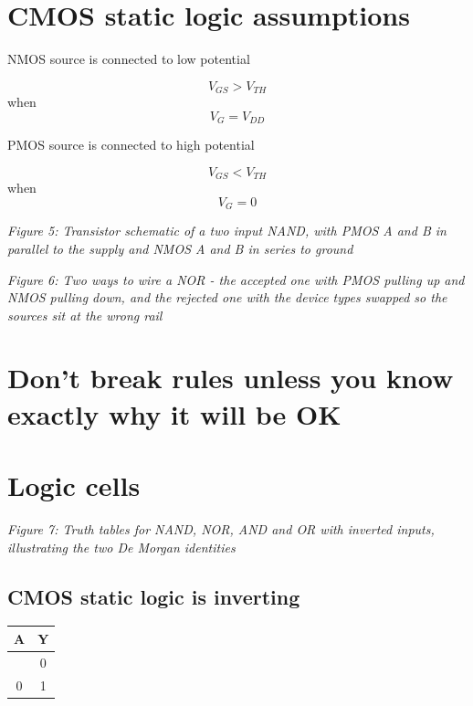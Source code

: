 \section{CMOS static logic
assumptions}\label{cmos-static-logic-assumptions}

NMOS source is connected to low potential

\[ V_{GS} > V_{TH}\] when \[V_G = V_{DD}\]

PMOS source is connected to high potential

\[ V_{GS} < V_{TH}\] when \[V_G = 0\]


{
\centering
{}
}

\emph{Figure 5: Transistor schematic of a two input NAND, with PMOS A
and B in parallel to the supply and NMOS A and B in series to ground}


{
\centering
{}
}

\emph{Figure 6: Two ways to wire a NOR - the accepted one with PMOS
pulling up and NMOS pulling down, and the rejected one with the device
types swapped so the sources sit at the wrong rail}

\section{Don't break rules unless you know exactly why it will be
OK}\label{dont-break-rules-unless-you-know-exactly-why-it-will-be-ok}

\section{Logic cells}\label{logic-cells}


{
\centering
{}
}

\emph{Figure 7: Truth tables for NAND, NOR, AND and OR with inverted
inputs, illustrating the two De Morgan identities}

\subsection{CMOS static logic is
inverting}\label{cmos-static-logic-is-inverting}

\begin{longtable}[]{@{}cc@{}}
\toprule\noalign{}
A & Y \\
\midrule\noalign{}
\endhead
\bottomrule\noalign{}
\endlastfoot
1 & 0 \\
0 & 1 \\
\end{longtable}


